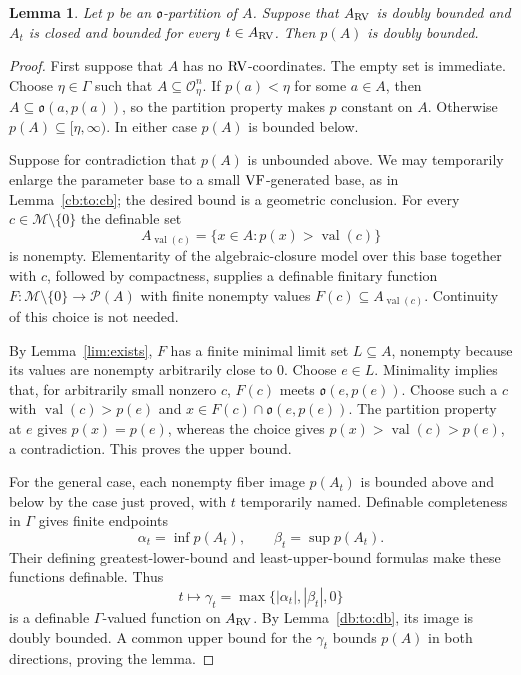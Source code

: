 \documentclass[12pt]{amsart}
\theoremstyle{plain}
\newtheorem{lem}[thm]{Lemma}
\theoremstyle{definition}
\theoremstyle{remark}
\numberwithin{equation}{section}
\theoremstyle{plain}
\newcommand{\VF}{\textup{VF}}
\newcommand{\RV}{\textup{RV}}
\newcommand{\MM}{\mdl M}
\newcommand{\OO}{\mdl O}
\newcommand{\go}{\mathfrak{o}}
\newcommand{\0}{\emptyset}
\newcommand{\mdl}[1]{\mathcal{#1}}  %
\newcommand{\fun}{\longrightarrow}
\newcommand{\efun}{\longmapsto}
\DeclareMathOperator{\vv}{val}
\begin{document}
\begin{lem}\label{vol:par:bounded}
Let $p$ be an $\go$-partition of $A$. Suppose that $A_{\RV}$ is doubly bounded and $A_t$ is closed and bounded for every $t \in A_{\RV}$. Then $p(A)$ is doubly bounded.
\end{lem}
\begin{proof}
First suppose that $A$ has no $\RV$-coordinates. The empty set is immediate. Choose $\eta\in\Gamma$ such that $A\subseteq\OO_\eta^n$. If $p(a)<\eta$ for some $a\in A$, then $A\subseteq\go(a,p(a))$, so the partition property makes $p$ constant on $A$. Otherwise $p(A)\subseteq[\eta,\infty)$. In either case $p(A)$ is bounded below.

Suppose for contradiction that $p(A)$ is unbounded above. We may temporarily enlarge the parameter base to a small $\VF$-generated base, as in Lemma~\ref{cb:to:cb}; the desired bound is a geometric conclusion. For every $c\in\MM\setminus\{0\}$ the definable set
\[
A_{\vv(c)}=\{x\in A:p(x)>\vv(c)\}
\]
is nonempty. Elementarity of the algebraic-closure model over this base together with $c$, followed by compactness, supplies a definable finitary function $F:\MM\setminus\{0\}\fun\mdl P(A)$ with finite nonempty values $F(c)\subseteq A_{\vv(c)}$. Continuity of this choice is not needed.

By Lemma~\ref{lim:exists}, $F$ has a finite minimal limit set $L\subseteq A$, nonempty because its values are nonempty arbitrarily close to $0$. Choose $e\in L$. Minimality implies that, for arbitrarily small nonzero $c$, $F(c)$ meets $\go(e,p(e))$. Choose such a $c$ with $\vv(c)>p(e)$ and $x\in F(c)\cap\go(e,p(e))$. The partition property at $e$ gives $p(x)=p(e)$, whereas the choice gives $p(x)>\vv(c)>p(e)$, a contradiction. This proves the upper bound.

For the general case, each nonempty fiber image $p(A_t)$ is bounded above and below by the case just proved, with $t$ temporarily named. Definable completeness in $\Gamma$ gives finite endpoints
\[
\alpha_t=\inf p(A_t),\qquad \beta_t=\sup p(A_t).
\]
Their defining greatest-lower-bound and least-upper-bound formulas make these functions definable. Thus
\[
t\efun\gamma_t=\max\{|\alpha_t|,|\beta_t|,0\}
\]
is a definable $\Gamma$-valued function on $A_{\RV}$. By Lemma~\ref{db:to:db}, its image is doubly bounded. A common upper bound for the $\gamma_t$ bounds $p(A)$ in both directions, proving the lemma.
\end{proof}
\end{document}
